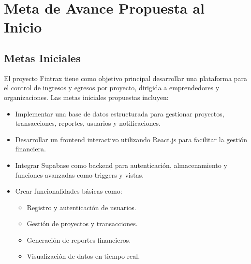 \section{Meta de Avance Propuesta al Inicio}

\subsection*{Metas Iniciales}
El proyecto Fintrax tiene como objetivo principal desarrollar una plataforma para el control de ingresos y egresos por proyecto, dirigida a emprendedores y organizaciones. Las metas iniciales propuestas incluyen:
\begin{itemize}
    \item Implementar una base de datos estructurada para gestionar proyectos, transacciones, reportes, usuarios y notificaciones.
    \item Desarrollar un frontend interactivo utilizando React.js para facilitar la gestión financiera.
    \item Integrar Supabase como backend para autenticación, almacenamiento y funciones avanzadas como triggers y vistas.
    \item Crear funcionalidades básicas como:
    \begin{itemize}
        \item Registro y autenticación de usuarios.
        \item Gestión de proyectos y transacciones.
        \item Generación de reportes financieros.
        \item Visualización de datos en tiempo real.
    \end{itemize}
\end{itemize}


